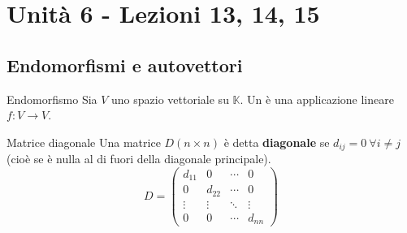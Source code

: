 \documentclass[a4paper]{article}
\theoremstyle{definition}
\begin{document}
	\section{Unità 6  - Lezioni 13, 14, 15}
	\subsection{Endomorfismi e autovettori}
	\begin{deff}{Endomorfismo}{}
		Sia $V$ uno spazio vettoriale su $\mathbb{K}$. Un  è una applicazione lineare $f: V \to V$.
	\end{deff}
	\begin{deff}{Matrice diagonale}{}
		Una matrice $D (n \times n)$ è detta \textbf{diagonale} se $d_{ij} = 0 \ \forall i \ne j$ (cioè se è nulla al di fuori della diagonale principale).
		\begin{equation*}
			D = \begin{pmatrix}
				d_{11} & 0 & \cdots & 0 \\
				0 & d_{22} & \cdots & 0 \\
				\vdots & \vdots & \ddots & \vdots \\
				0 & 0 & \cdots & d_{nn}
			\end{pmatrix}
		\end{equation*}
	\end{deff}
\end{document}
